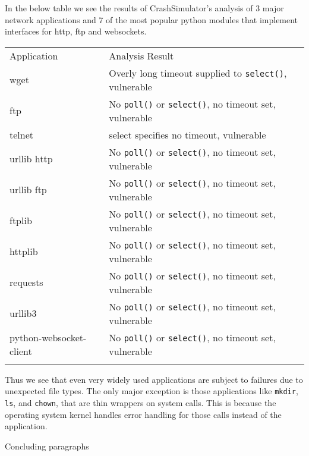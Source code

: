In the below table we see the results of CrashSimulator's analysis of 3 major network applications and 7
of the most popular python modules that implement interfaces for http, ftp and websockets.

\begin{table*}[t]
  \scriptsize{}
  \begin{tabular}{l | l}
    Application              & Analysis Result\\
    wget                     & Overly long timeout supplied to {\tt select()}, vulnerable\\
    ftp                      & No {\tt poll()} or {\tt select()}, no timeout set, vulnerable\\
    telnet                   & select specifies no timeout, vulnerable\\
    urllib http              & No {\tt poll()} or {\tt select()}, no timeout set, vulnerable\\
    urllib ftp               & No {\tt poll()} or {\tt select()}, no timeout set, vulnerable\\
    ftplib                   & No {\tt poll()} or {\tt select()}, no timeout set, vulnerable\\
    httplib                  & No {\tt poll()} or {\tt select()}, no timeout set, vulnerable\\
    requests                 & No {\tt poll()} or {\tt select()}, no timeout set, vulnerable\\
    urllib3                  & No {\tt poll()} or {\tt select()}, no timeout set, vulnerable\\
    python-websocket-client  & No {\tt poll()} or {\tt select()}, no timeout set, vulnerable\\
  \bottomrule{}
  \end{tabular}
\end{table*}



Thus we see that even very 
widely used applications are subject to failures due to unexpected file 
types.  The only major exception is those applications like {\tt mkdir}, 
{\tt ls}, and {\tt chown}, that are thin wrappers on system calls.  This 
is because the operating system kernel handles error handling for those 
calls instead of the application.


Concluding paragraphs









